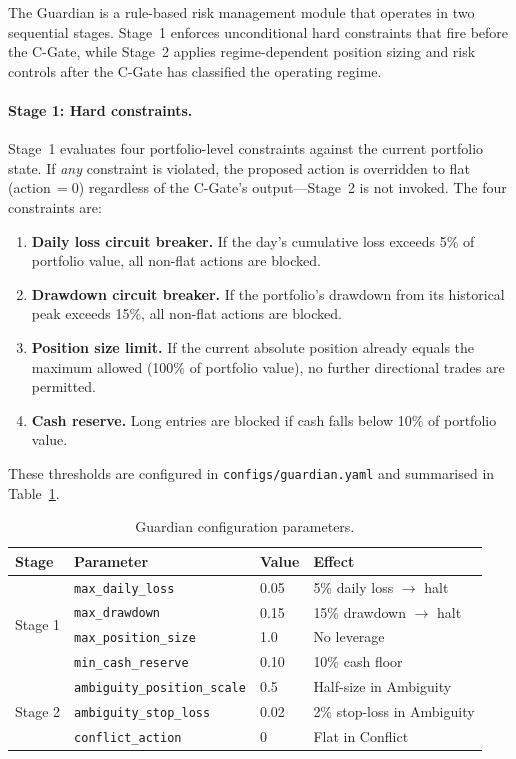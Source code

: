 The Guardian is a rule-based risk management module that operates in two
sequential stages. Stage~1 enforces unconditional hard constraints that
fire before the C-Gate, while Stage~2 applies regime-dependent position
sizing and risk controls after the C-Gate has classified the operating
regime.

\paragraph{Stage 1: Hard constraints.}
Stage~1 evaluates four portfolio-level constraints against the current
portfolio state. If \emph{any} constraint is violated, the proposed action
is overridden to flat (action$\,= 0$) regardless of the C-Gate's
output---Stage~2 is not invoked. The four constraints are:

\begin{enumerate}
  \item \textbf{Daily loss circuit breaker.} If the day's cumulative loss
    exceeds 5\% of portfolio value, all non-flat actions are blocked.
  \item \textbf{Drawdown circuit breaker.} If the portfolio's drawdown
    from its historical peak exceeds 15\%, all non-flat actions are
    blocked.
  \item \textbf{Position size limit.} If the current absolute position
    already equals the maximum allowed (100\% of portfolio value), no
    further directional trades are permitted.
  \item \textbf{Cash reserve.} Long entries are blocked if cash falls
    below 10\% of portfolio value.
\end{enumerate}

These thresholds are configured in \texttt{configs/guardian.yaml} and
summarised in Table~\ref{tab:guardian-config}.

\begin{table}[t]
\centering
\caption{Guardian configuration parameters.}
\label{tab:guardian-config}
\begin{tabular}{@{}llll@{}}
\toprule
\textbf{Stage} & \textbf{Parameter} & \textbf{Value} & \textbf{Effect} \\
\midrule
\multirow{4}{*}{Stage 1}
  & \texttt{max\_daily\_loss}     & 0.05  & 5\% daily loss $\rightarrow$ halt \\
  & \texttt{max\_drawdown}        & 0.15  & 15\% drawdown $\rightarrow$ halt \\
  & \texttt{max\_position\_size}  & 1.0   & No leverage \\
  & \texttt{min\_cash\_reserve}   & 0.10  & 10\% cash floor \\
\midrule
\multirow{3}{*}{Stage 2}
  & \texttt{ambiguity\_position\_scale} & 0.5  & Half-size in Ambiguity \\
  & \texttt{ambiguity\_stop\_loss}      & 0.02 & 2\% stop-loss in Ambiguity \\
  & \texttt{conflict\_action}           & 0    & Flat in Conflict \\
\bottomrule
\end{tabular}
\end{table}

